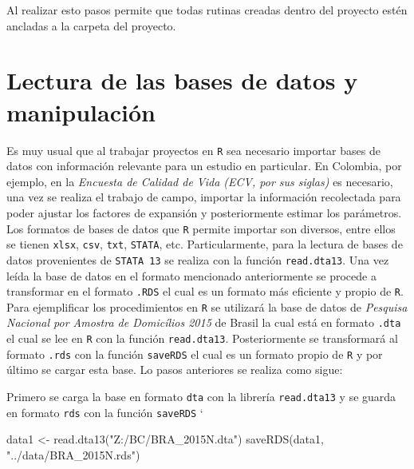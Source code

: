 \documentclass[
  12pt,
]{book}
\newenvironment{Shaded}{\begin{snugshade}}{\end{snugshade}}
\newcommand{\FunctionTok}[1]{\textcolor[rgb]{0.00,0.00,0.00}{#1}}
\newcommand{\NormalTok}[1]{#1}
\newcommand{\OtherTok}[1]{\textcolor[rgb]{0.56,0.35,0.01}{#1}}
\newcommand{\StringTok}[1]{\textcolor[rgb]{0.31,0.60,0.02}{#1}}
\begin{document}
Al realizar esto pasos permite que todas rutinas creadas dentro del proyecto estén ancladas a la carpeta del proyecto.

\hypertarget{lectura-de-las-bases-de-datos-y-manipulaciuxf3n}{%
\section{Lectura de las bases de datos y manipulación}\label{lectura-de-las-bases-de-datos-y-manipulaciuxf3n}}

Es muy usual que al trabajar proyectos en \texttt{R} sea necesario importar bases de datos con información relevante para un estudio en particular. En Colombia, por ejemplo, en la \emph{Encuesta de Calidad de Vida (ECV, por sus siglas)} es necesario, una vez se realiza el trabajo de campo, importar la información recolectada para poder ajustar los factores de expansión y posteriormente estimar los parámetros. Los formatos de bases de datos que \texttt{R} permite importar son diversos, entre ellos se tienen \texttt{xlsx}, \texttt{csv}, \texttt{txt}, \texttt{STATA}, etc. Particularmente, para la lectura de bases de datos provenientes de \texttt{STATA\ 13} se realiza con la función \texttt{read.dta13}. Una vez leída la base de datos en el formato mencionado anteriormente se procede a transformar en el formato \texttt{.RDS} el cual es un formato más eficiente y propio de \texttt{R}. Para ejemplificar los procedimientos en \texttt{R} se utilizará la base de datos de \emph{Pesquisa Nacional por Amostra de Domicílios 2015 } de Brasil la cual está en formato \texttt{.dta} el cual se lee en \texttt{R} con la función \texttt{read.dta13}. Posteriormente se transformará al formato \texttt{.rds} con la función \texttt{saveRDS} el cual es un formato propio de \texttt{R} y por último se cargar esta base. Lo pasos anteriores se realiza como sigue:

Primero se carga la base en formato \texttt{dta} con la librería \texttt{read.dta13} y se guarda en formato \texttt{rds} con la función \texttt{saveRDS}
`

\begin{Shaded}
\begin{Highlighting}[]
\NormalTok{data1 }\OtherTok{\textless{}{-}} \FunctionTok{read.dta13}\NormalTok{(}\StringTok{"Z:/BC/BRA\_2015N.dta"}\NormalTok{)}
\FunctionTok{saveRDS}\NormalTok{(data1, }\StringTok{"../data/BRA\_2015N.rds"}\NormalTok{) }
\end{Highlighting}
\end{Shaded}
\end{document}
